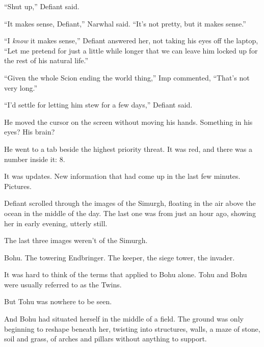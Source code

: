 ``Shut up,'' Defiant said.



``It makes sense, Defiant,'' Narwhal said. ``It's not pretty, but it makes sense.''



``I \emph{know} it makes sense,'' Defiant answered her, not taking his eyes off the laptop, ``Let me pretend for just a little while longer that we can leave him locked up for the rest of his natural life.''



``Given the whole Scion ending the world thing,'' Imp commented, ``That's not very long.''



``I'd settle for letting him stew for a few days,'' Defiant said.



He moved the cursor on the screen without moving his hands.  Something in his eyes?  His brain?



He went to a tab beside the highest priority threat.  It was red, and there was a number inside it: 8.



It was updates.  New information that had come up in the last few minutes.  Pictures.



Defiant scrolled through the images of the Simurgh, floating in the air above the ocean in the middle of the day.  The last one was from just an hour ago, showing her in early evening, utterly still.



The last three images weren't of the Simurgh.



Bohu.  The towering Endbringer.  The keeper, the siege tower, the invader.



It was hard to think of the terms that applied to Bohu alone.  Tohu and Bohu were usually referred to as the Twins.



But Tohu was nowhere to be seen.



And Bohu had situated herself in the middle of a field.  The ground was only beginning to reshape beneath her, twisting into structures, walls, a maze of stone, soil and grass, of arches and pillars without anything to support.



